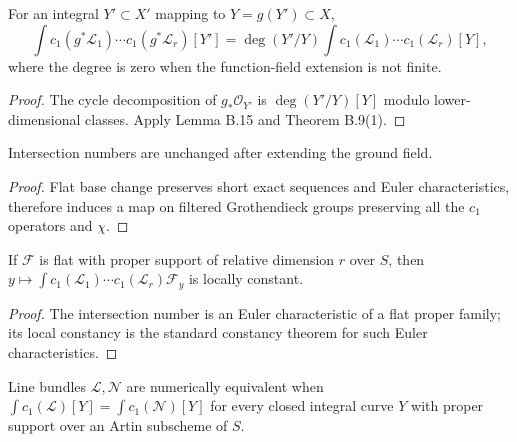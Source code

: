 \begin{proposition}\label{kps-prop-projection-formula}
For an integral $Y'\subset X'$ mapping to $Y=g(Y')\subset X$,
\[
 \int c_1(g^*\mathcal L_1)\cdots c_1(g^*\mathcal L_r)[Y']
 =\deg(Y'/Y)\int c_1(\mathcal L_1)\cdots c_1(\mathcal L_r)[Y],
\]
where the degree is zero when the function-field extension is not finite.
\end{proposition}
\begin{proof}
The cycle decomposition of $g_*\mathcal O_{Y'}$ is
$\deg(Y'/Y)[Y]$ modulo lower-dimensional classes. Apply Lemma B.15 and
Theorem B.9(1).
\end{proof}

\begin{proposition}\label{kps-prop-intersection-base-change}
Intersection numbers are unchanged after extending the ground field.
\end{proposition}
\begin{proof}
Flat base change preserves short exact sequences and Euler characteristics,
therefore induces a map on filtered Grothendieck groups preserving all the
$c_1$ operators and $\chi$.
\end{proof}

\begin{proposition}\label{kps-prop-intersection-family}
If $\mathcal F$ is flat with proper support of relative dimension $r$ over
$S$, then
$y\mapsto\int c_1(\mathcal L_1)\cdots c_1(\mathcal L_r)\mathcal F_y$
is locally constant.
\end{proposition}
\begin{proof}
The intersection number is an Euler characteristic of a flat proper family;
its local constancy is the standard constancy theorem for such Euler
characteristics.
\end{proof}

\begin{definition}\label{kps-def-family-numerical}
Line bundles $\mathcal L,\mathcal N$ are numerically equivalent when
$\int c_1(\mathcal L)[Y]=\int c_1(\mathcal N)[Y]$ for every closed integral
curve $Y$ with proper support over an Artin subscheme of $S$.
\end{definition}

